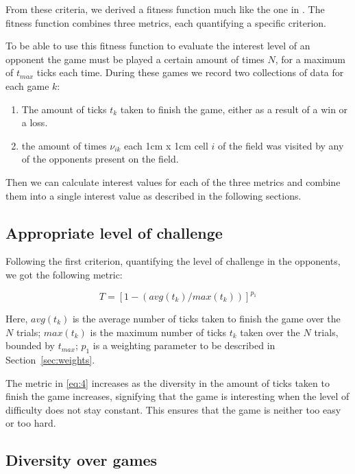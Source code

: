 From these criteria, we derived a fitness function much like the one in
\citet[Chap.~2.2.2]{yannakakis2005ai}. The fitness function combines three
metrics, each quantifying a specific criterion.

To be able to use this fitness function to evaluate the interest level of an
opponent the game must be played a certain amount of times \(N\), for a maximum
of \(t_{max}\) ticks each time. During these games we record two collections of
data for each game \(k\):

\begin{enumerate}
   \item The amount of ticks \(t_k\) taken to finish the game, either as a
   result of a win or a loss.

   \item the amount of times \(\nu_{ik}\) each 1cm x 1cm cell \(i\) of the field
   was visited by any of the opponents present on the field.

\end{enumerate}

Then we can calculate interest values for each of the three metrics and combine
them into a single interest value as described in the following sections.

\subsection{Appropriate level of challenge}
\label{sec:appr-level-chall}

Following the first criterion, quantifying the level of challenge in the
opponents, we got the following metric:

\begin{equation}
  \label{eq:4}
  T = [ 1- (avg(t_k)/max(t_k))]^{p_1}
\end{equation}

Here, \(avg(t_k)\) is the average number of ticks taken to finish the game over
the \(N\) trials; \(max(t_k)\) is the maximum number of ticks \(t_k\) taken over
the \(N\) trials, bounded by \(t_{max}\); \(p_1\) is a weighting parameter to be
described in Section~\ref{sec:weights}.

The metric in \eqref{eq:4} increases as the diversity in the amount of ticks
taken to finish the game increases, signifying that the game is interesting when
the level of difficulty does not stay constant. This ensures that the game is
neither too easy or too hard.

\subsection{Diversity over games}
\label{sec:diversity-over-games}

